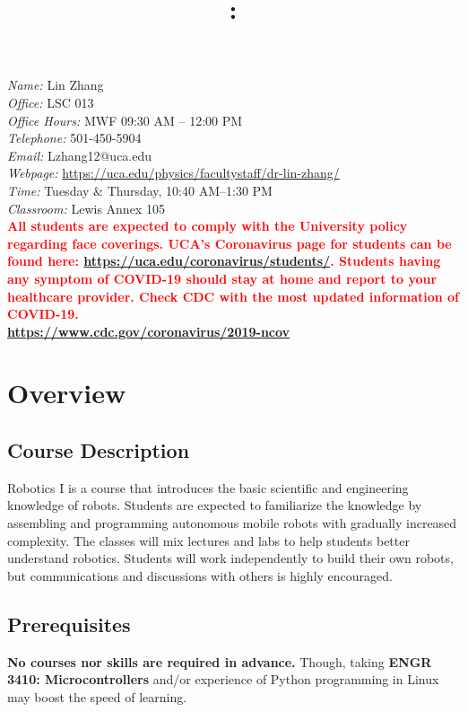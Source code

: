 \documentclass[11pt,letterpaper]{article}
\title{\Large\bfseries \coursecode: \coursetitle \\[0.1cm] \semester}
\author{}
\date{}
\makeatletter
\newcommand{\lefthead}[2]{\noindent{\large\textbf{#1}\hfill\\[#2]}}
\newcommand{\instructor}{Lin Zhang}
\newcommand{\office}{LSC 013}
\newcommand{\email}{Lzhang12@uca.edu}
\newcommand{\officehours}{MWF 09:30 AM -- 12:00 PM}
\newcommand{\classroom}{Lewis Annex 105}
\newcommand{\classtime}{Tuesday \& Thursday, 10:40 AM--1:30 PM}
\newcommand{\telephone}{501-450-5904}
\newcommand{\webpage}{\href{https://uca.edu/physics/facultystaff/dr-lin-zhang/}{https://uca.edu/physics/facultystaff/dr-lin-zhang/}}
\makeatother
\begin{document}
\maketitle
\thispagestyle{empty}
\vspace{-2cm}


\lefthead{Instructor}{0.3cm}
\indent \emph{Name:} \instructor \\
\indent \emph{Office:} \office \\
\indent \emph{Office Hours:} \officehours \\
\indent \emph{Telephone:} \telephone \\
\indent \emph{Email:} \email \\
\indent \emph{Webpage:} \webpage \\

\lefthead{Class \& Lab}{0.3cm}
\indent \emph{Time:} \classtime \\
\indent \emph{Classroom:} \classroom \\[0.3cm]


\noindent \textbf{\textcolor{red}{All students are expected to comply with the University policy regarding face coverings. UCA’s Coronavirus page for students can be found here: \href{https://uca.edu/coronavirus/students/}{https://uca.edu/coronavirus/students/}. Students having any symptom of COVID-19 should stay at home and report to your healthcare provider. Check CDC with the most updated information of COVID-19. \\\href{https://www.cdc.gov/coronavirus/2019-ncov}{https://www.cdc.gov/coronavirus/2019-ncov}}} 

\section*{Overview}
\subsection*{Course Description}
Robotics I is a course that introduces the basic scientific and engineering knowledge of robots. Students are expected to familiarize the knowledge by assembling and programming autonomous mobile robots with gradually increased complexity. The classes will mix lectures and labs to help students better understand robotics. Students will work independently to build their own robots, but communications and discussions with others is highly encouraged. 

\subsection*{Prerequisites}
\textbf{No courses nor skills are required in advance.} Though, taking \textbf{ENGR 3410: Microcontrollers} and/or experience of Python programming in Linux may boost the speed of learning. 
\end{document}
